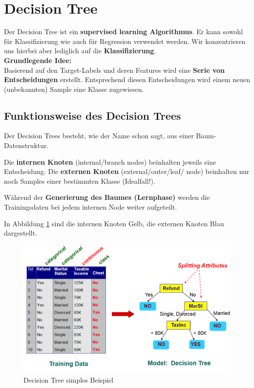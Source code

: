 \newpage
\section{Decision Tree}

Der Decision Tree ist ein \textbf{supervised learning Algorithmus}. Er kann sowohl für Klassifizierung wie auch für Regression verwendet werden. Wir konzentrieren uns hierbei aber lediglich auf die \textbf{Klassifizierung}. \\

\textbf{Grundlegende Idee:} \\
Basierend auf den Target-Labels und deren Features wird eine \textbf{Serie von Entscheidungen} erstellt. Entsprechend diesen Entscheidungen wird einem neuen (unbekannten) Sample eine Klasse zugewiesen. 

\subsection{Funktionsweise des Decision Trees}

Der Decision Trees besteht, wie der Name schon sagt, aus einer Baum-Datenstruktur. 

Die \textbf{internen Knoten} (internal/branch nodes) beinhalten jeweils eine Entscheidung. Die \textbf{externen Knoten} (external/outer/leaf/ node) beinhalten nur noch Samples einer bestimmten Klasse (Idealfall!).

Während der \textbf{Generierung des Baumes (Lernphase)} werden die Trainingsdaten bei jedem internen Node weiter aufgeteilt.

In Abbildung \ref{fig:dt_simple} sind die internen Knoten Gelb, die externen Knoten Blau dargestellt.

\begin{figure}[h!]
	\includegraphics[scale=0.8]{figures/decision_tree_simple}
	\caption{Decision Tree simples Beispiel}
	\label{fig:dt_simple}
\end{figure}

